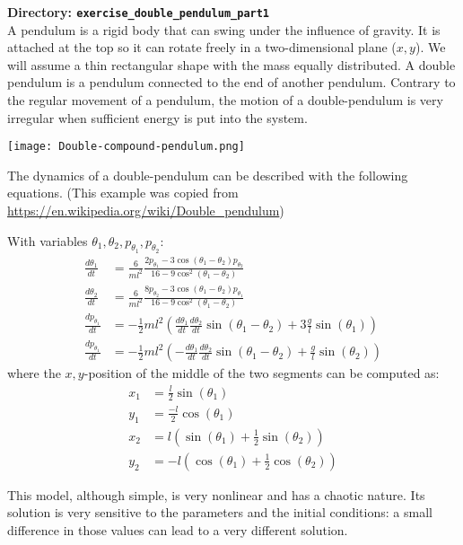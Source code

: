 {\bf Directory: {\tt exercise\_double\_pendulum\_part1}}\\

A pendulum is a rigid body that can swing under the influence of gravity. It is attached at the top so it can rotate freely in a two-dimensional plane ($x,y$).
We will assume a thin rectangular shape with the mass equally distributed. A double pendulum is a pendulum connected to the end of another pendulum. Contrary to the 
regular movement of a pendulum, the motion of a double-pendulum is very irregular when sufficient energy is put into the system. 

\texttt{[image: Double-compound-pendulum.png]}

The dynamics of a double-pendulum can be described with the following equations. 
(This example was copied from \url{https://en.wikipedia.org/wiki/Double_pendulum})

With variables $\theta_1, \theta_2, p_{\theta_1}, p_{\theta_2}$:
\begin{align}
   \frac{d \theta_1}{dt}&= \frac{6}{m l^2} \frac{2 p_{\theta_1} - 3\cos(\theta_1-\theta_2) p_{\theta_2}}
   {16-9 \cos^2(\theta_1-\theta_2)}\\
   \frac{d \theta_2}{dt}&= \frac{6}{m l^2} \frac{8 p_{\theta_2} - 3\cos(\theta_1-\theta_2) p_{\theta_1}}
   {16-9 \cos^2(\theta_1-\theta_2)}\\
   \frac{dp_{\theta_1}}{dt} &= -\frac{1}{2} ml^2 \left( \frac{d \theta_1}{dt} \frac{d \theta_2}{dt} \sin(\theta_1-\theta_2) + 3\frac{g}{l} \sin(\theta_1) \right)  \\
   \frac{dp_{\theta_1}}{dt} &= -\frac{1}{2} ml^2 \left( -\frac{d \theta_1}{dt} \frac{d \theta_2}{dt} \sin(\theta_1-\theta_2) + \frac{g}{l} \sin(\theta_2) \right) 
\end{align}
where the $x,y$-position of the middle of the two segments can be computed as:
\begin{align}
   x_1 &= \frac{l}{2} \sin(\theta_1) \\
   y_1 &= \frac{-l}{2} \cos(\theta_1) \\
   x_2 &= l ( \sin(\theta_1) + \frac{1}{2} \sin(\theta_2) ) \\
   y_2 &= -l ( \cos(\theta_1) + \frac{1}{2} \cos(\theta_2) )
\end{align}

This model, although simple, is very nonlinear and has a chaotic nature.  Its
solution is very sensitive to the parameters and the initial conditions: a
small difference in those values can lead to a very different solution.

